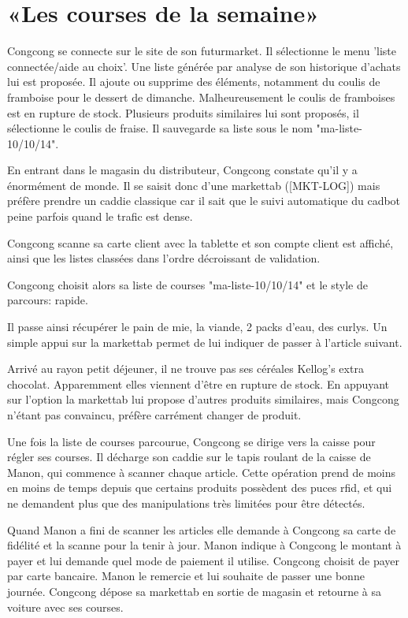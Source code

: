 \section{«Les courses de la semaine»}

Congcong se connecte sur le site de son futurmarket.
Il sélectionne le menu 'liste connectée/aide au choix'.
Une liste générée par analyse de son historique d'achats lui est proposée.
Il ajoute ou supprime des éléments, notamment du coulis de framboise pour le dessert de dimanche.
Malheureusement le coulis de framboises est en rupture de stock.
Plusieurs produits similaires lui sont proposés, il sélectionne le coulis de fraise.
Il sauvegarde sa liste sous le nom "ma-liste-10/10/14".
\par
En entrant dans le magasin du distributeur, Congcong constate qu'il y a énormément de monde.
Il se saisit donc d'une markettab ([MKT-LOG]) mais préfère prendre un caddie classique car il sait que le suivi automatique du cadbot peine parfois quand le trafic est dense. 

Congcong scanne sa carte client avec la tablette et son compte client est affiché, ainsi que les listes classées dans l'ordre décroissant de validation.

Congcong choisit alors sa liste de courses "ma-liste-10/10/14" et le style de parcours: rapide.\par
Il passe ainsi récupérer le pain de mie, la viande, 2 packs d'eau, des curlys.
Un simple appui sur la markettab permet de lui indiquer de passer à l'article suivant.

\par
Arrivé au rayon petit déjeuner, il ne trouve pas ses céréales Kellog's extra chocolat.
Apparemment elles viennent d'être en rupture de stock.
En appuyant sur l'option \type{[variante]} la markettab lui propose d'autres produits similaires, mais Congcong n'étant pas convaincu, préfère carrément changer de produit.
\par
Une fois la liste de courses parcourue, Congcong se dirige vers la caisse pour régler ses courses. 
Il décharge son caddie sur le tapis roulant de la caisse de Manon, qui commence à scanner chaque article.
Cette opération prend de moins en moins de temps depuis que certains produits possèdent des puces rfid, et qui ne demandent plus que des manipulations très limitées pour être détectés.
\par
Quand Manon a fini de scanner les articles elle demande à Congcong sa carte de fidélité et la scanne pour la tenir à jour.
Manon indique à Congcong le montant à payer et lui demande quel mode de paiement il utilise.
Congcong choisit de payer par carte bancaire. 
Manon le remercie et lui souhaite de passer une bonne journée.
Congcong dépose sa markettab en sortie de magasin et retourne à sa voiture avec ses courses.
